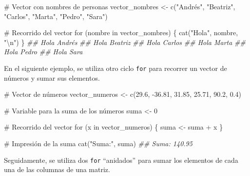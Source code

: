 \documentclass[
  letterpaper,
  DIV=11,
  numbers=noendperiod]{scrreprt}
\newenvironment{Shaded}{\begin{snugshade}}{\end{snugshade}}
\newcommand{\CommentTok}[1]{\textcolor[rgb]{0.37,0.37,0.37}{#1}}
\newcommand{\ControlFlowTok}[1]{\textcolor[rgb]{0.00,0.23,0.31}{#1}}
\newcommand{\DecValTok}[1]{\textcolor[rgb]{0.68,0.00,0.00}{#1}}
\newcommand{\DocumentationTok}[1]{\textcolor[rgb]{0.37,0.37,0.37}{\textit{#1}}}
\newcommand{\FloatTok}[1]{\textcolor[rgb]{0.68,0.00,0.00}{#1}}
\newcommand{\FunctionTok}[1]{\textcolor[rgb]{0.28,0.35,0.67}{#1}}
\newcommand{\NormalTok}[1]{\textcolor[rgb]{0.00,0.23,0.31}{#1}}
\newcommand{\OtherTok}[1]{\textcolor[rgb]{0.00,0.23,0.31}{#1}}
\newcommand{\SpecialCharTok}[1]{\textcolor[rgb]{0.37,0.37,0.37}{#1}}
\newcommand{\StringTok}[1]{\textcolor[rgb]{0.13,0.47,0.30}{#1}}
\begin{document}
\begin{Shaded}
\begin{Highlighting}[]
\CommentTok{\# Vector con nombres de personas}
\NormalTok{vector\_nombres }\OtherTok{\textless{}{-}} \FunctionTok{c}\NormalTok{(}\StringTok{"Andrés"}\NormalTok{, }\StringTok{"Beatriz"}\NormalTok{, }\StringTok{"Carlos"}\NormalTok{, }\StringTok{"Marta"}\NormalTok{, }\StringTok{"Pedro"}\NormalTok{, }\StringTok{"Sara"}\NormalTok{)}

\CommentTok{\# Recorrido del vector}
\ControlFlowTok{for}\NormalTok{ (nombre }\ControlFlowTok{in}\NormalTok{ vector\_nombres) \{}
  \FunctionTok{cat}\NormalTok{(}\StringTok{"Hola"}\NormalTok{, nombre, }\StringTok{"}\SpecialCharTok{\textbackslash{}n}\StringTok{"}\NormalTok{)}
\NormalTok{\}}
\DocumentationTok{\#\# Hola Andrés }
\DocumentationTok{\#\# Hola Beatriz }
\DocumentationTok{\#\# Hola Carlos }
\DocumentationTok{\#\# Hola Marta }
\DocumentationTok{\#\# Hola Pedro }
\DocumentationTok{\#\# Hola Sara}
\end{Highlighting}
\end{Shaded}

En el siguiente ejemplo, se utiliza otro ciclo \texttt{for} para
recorrer un vector de números y sumar sus elementos.

\begin{Shaded}
\begin{Highlighting}[]
\CommentTok{\# Vector de números}
\NormalTok{vector\_numeros }\OtherTok{\textless{}{-}} \FunctionTok{c}\NormalTok{(}\FloatTok{29.6}\NormalTok{, }\SpecialCharTok{{-}}\FloatTok{36.81}\NormalTok{, }\FloatTok{31.85}\NormalTok{, }\FloatTok{25.71}\NormalTok{, }\FloatTok{90.2}\NormalTok{, }\FloatTok{0.4}\NormalTok{)}

\CommentTok{\# Variable para la suma de los números}
\NormalTok{suma }\OtherTok{\textless{}{-}} \DecValTok{0}

\CommentTok{\# Recorrido del vector}
\ControlFlowTok{for}\NormalTok{ (x }\ControlFlowTok{in}\NormalTok{ vector\_numeros) \{}
\NormalTok{  suma }\OtherTok{\textless{}{-}}\NormalTok{ suma }\SpecialCharTok{+}\NormalTok{ x}
\NormalTok{\}}

\CommentTok{\# Impresión de la suma}
\FunctionTok{cat}\NormalTok{(}\StringTok{"Suma:"}\NormalTok{, suma)}
\DocumentationTok{\#\# Suma: 140.95}
\end{Highlighting}
\end{Shaded}

Seguidamente, se utiliza dos \texttt{for} ``anidados'' para sumar los
elementos de cada una de las columnas de una matriz.
\end{document}
